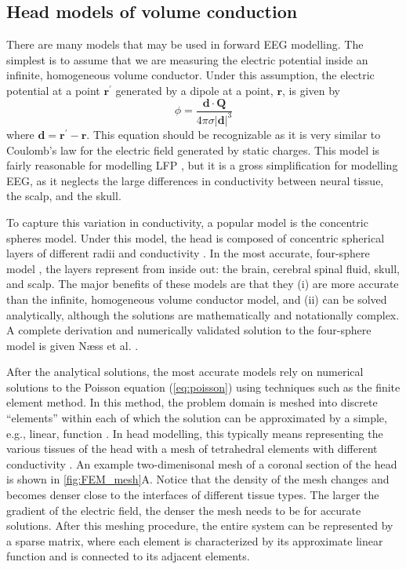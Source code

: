 \subsection{Head models of volume conduction} \label{sec:head_models}
There are many models that may be used in forward EEG modelling. The simplest is to assume that we are measuring the electric potential inside an infinite, homogeneous volume conductor. Under this assumption, the electric potential at a point $\bm{r}^\prime$ generated by a dipole at a point, $\bm{r}$, is given by
\begin{equation}
    \phi = \frac{\bm{d} \cdot \bm{Q}}{4\pi\sigma |\bm{d}|^3}
\end{equation}
where $\bm{d}=\bm{r}^\prime-\bm{r}$. This equation should be recognizable as it is very similar to Coulomb's law for the electric field generated by static charges. This model is fairly reasonable for modelling LFP \cite{Pettersen2012}, but it is a gross simplification for modelling EEG, as it neglects the large differences in conductivity between neural tissue, the scalp, and the skull.

To capture this variation in conductivity, a popular model is the concentric spheres model. Under this model, the head is composed of concentric spherical layers of different radii and conductivity \cite{Geisler1961}. In the most accurate, four-sphere model \cite{Hosek1978}, the layers represent from inside out: the brain, cerebral spinal fluid, skull, and scalp. The major benefits of these models are that they (i) are more accurate than the infinite, homogeneous volume conductor model, and (ii) can be solved analytically, although the solutions are mathematically and notationally complex. A complete derivation and numerically validated solution to the four-sphere model is given Næss et al. \cite{Næss2017}.

After the analytical solutions, the most accurate models rely on numerical solutions to the Poisson equation (\ref{eq:poisson}) using techniques such as the finite element method. In this method, the problem domain is meshed into discrete ``elements'' within each of which the solution can be approximated by a simple, e.g., linear, function \cite{Liu2014}. In head modelling, this typically means representing the various tissues of the head with a mesh of tetrahedral elements with different conductivity \cite{Hallez2007}. An example two-dimenisonal mesh of a coronal section of the head is shown in \autoref{fig:FEM_mesh}A. Notice that the density of the mesh changes and becomes denser close to the interfaces of different tissue types. The larger the gradient of the electric field, the denser the mesh needs to be for accurate solutions. After this meshing procedure, the entire system can be represented by a sparse matrix, where each element is characterized by its approximate linear function and is connected to its adjacent elements.

